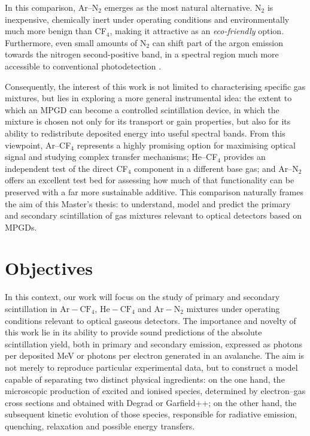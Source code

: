 \documentclass[12pt,a4paper]{article}
\newcommand{\N}{\mathrm{N}}
\newcommand{\He}{\mathrm{He}}
\newcommand{\Ar}{\mathrm{Ar}}
\newcommand{\CF}{\mathrm{CF}}
\begin{document}
In this comparison, Ar--N$_2$ emerges as the most natural alternative. N$_2$ is inexpensive, chemically inert under operating conditions and environmentally much more benign than CF$_4$, making it attractive as an \emph{eco-friendly} option. Furthermore, even small amounts of N$_2$ can shift part of the argon emission towards the nitrogen second-positive band, in a spectral region much more accessible to conventional photodetection \cite{puech1977energy,morii2004quenching,friedl2012spectral}.

Consequently, the interest of this work is not limited to characterising specific gas mixtures, but lies in exploring a more general instrumental idea: the extent to which an MPGD can become a controlled scintillation device, in which the mixture is chosen not only for its transport or gain properties, but also for its ability to redistribute deposited energy into useful spectral bands. From this viewpoint, Ar--CF$_4$ represents a highly promising option for maximising optical signal and studying complex transfer mechanisms; He--CF$_4$ provides an independent test of the direct CF$_4$ component in a different base gas; and Ar--N$_2$ offers an excellent test bed for assessing how much of that functionality can be preserved with a far more sustainable additive. This comparison naturally frames the aim of this Master's thesis: to understand, model and predict the primary and secondary scintillation of gas mixtures relevant to optical detectors based on MPGDs.

\section{Objectives}

In this context, our work will focus on the study of primary and secondary scintillation in $\Ar-\CF_4$, $\He-\CF_4$ and $\Ar-\N_2$ mixtures under operating conditions relevant to optical gaseous detectors. The importance and novelty of this work lie in its ability to provide sound predictions of the absolute scintillation yield, both in primary and secondary emission, expressed as photons per deposited MeV or photons per electron generated in an avalanche. The aim is not merely to reproduce particular experimental data, but to construct a model capable of separating two distinct physical ingredients: on the one hand, the microscopic production of excited and ionised species, determined by electron--gas cross sections and obtained with Degrad or Garfield++; on the other hand, the subsequent kinetic evolution of those species, responsible for radiative emission, quenching, relaxation and possible energy transfers.
\end{document}
